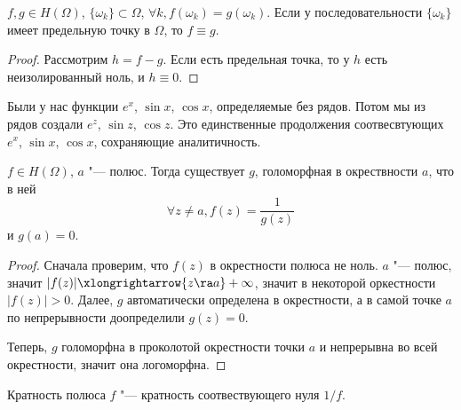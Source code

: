 \begin{theorem}[о единственности]
	$f, g \in H(\Omega)$, $\{\omega_k\} \subset \Omega$, $\forall k, f(\omega_k) = g(\omega_k)$.
	Если у последовательности $\{\omega_k\}$ имеет предельную точку в $\Omega$, то $f \equiv g$.
\end{theorem}
\begin{proof}
	Рассмотрим $h = f - g$.
	Если есть предельная точка, то у $h$ есть неизолированный ноль, и $h \equiv 0$.
\end{proof}

\begin{Rem}
	Были у нас функции $e^x$, $\sin x$, $\cos x$, определяемые без рядов.
	Потом мы из рядов создали $e^z$, $\sin z$, $\cos z$.
	Это единственные продолжения соотвесвтующих $e^x$, $\sin x$, $\cos x$, сохраняющие аналитичность.
\end{Rem}

\begin{theorem}
	$f \in H(\Omega)$, $a$ "--- полюс.
	Тогда существует $g$, голоморфная в окрествности $a$, что в ней
	\[ \forall z \ne a, f(z) = \frac1{g(z)} \]
	и $g(a) = 0$.
\end{theorem}
\begin{proof}
	Сначала проверим, что $f(z)$ в окрестности полюса не ноль.
	$a$ "--- полюс, значит $|f(z)| \xlongrightarrow{z \ra a} +\infty$, значит в некоторой оркестности $|f(z)| > 0$.
	Далее, $g$ автоматически определена в окрестности, а в самой точке $a$ по непрерывности доопределили $g(z) = 0$.

	Теперь, $g$ голоморфна в проколотой окрестности точки $a$ и непрерывна во всей окрестности, значит она логоморфна.
\end{proof}

\begin{Def}
	Кратность полюса $f$ "--- кратность соотвествующего нуля $1/f$.
\end{Def}

